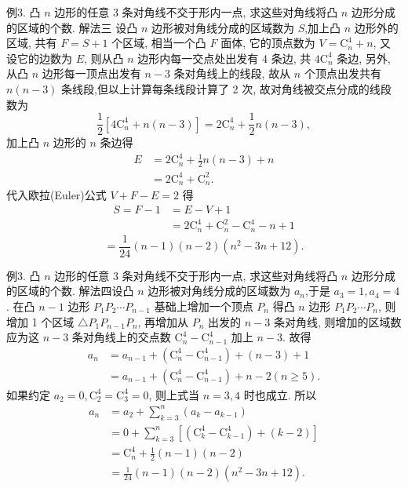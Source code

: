 例3. 凸 $n$ 边形的任意 3 条对角线不交于形内一点, 求这些对角线将凸 $n$ 边形分成的区域的个数.
解法三 设凸 $n$ 边形被对角线分成的区域数为 $S$,加上凸 $n$ 边形外的区域, 共有 $F=S+1$ 个区域, 相当一个凸 $F$ 面体, 它的顶点数为 $V=\mathrm{C}_n^4+n$, 又设它的边数为 $E$, 则从凸 $n$ 边形内每一交点处出发有 4 条边, 共 $4 \mathrm{C}_n^4$ 条边, 另外, 从凸 $n$ 边形每一顶点出发有 $n-3$ 条对角线上的线段, 故从 $n$ 个顶点出发共有 $n(n-3)$ 条线段,但以上计算每条线段计算了 2 次, 故对角线被交点分成的线段数为
$$
\frac{1}{2}\left[4 \mathrm{C}_n^4+n(n-3)\right]=2 \mathrm{C}_n^4+\frac{1}{2} n(n-3),
$$
加上凸 $n$ 边形的 $n$ 条边得
$$
\begin{aligned}
E & =2 \mathrm{C}_n^4+\frac{1}{2} n(n-3)+n \\
& =2 \mathrm{C}_n^4+\mathrm{C}_n^2 .
\end{aligned}
$$
代入欧拉(Euler)公式 $V+F-E=2$ 得
$$
\begin{aligned}
S=F-1 & =E-V+1 \\
& =2 \mathrm{C}_n^4+\mathrm{C}_n^2-\mathrm{C}_n^4-n+1
\end{aligned}
$$
$$
=\frac{1}{24}(n-1)(n-2)\left(n^2-3 n+12\right) .
$$



例3. 凸 $n$ 边形的任意 3 条对角线不交于形内一点, 求这些对角线将凸 $n$ 边形分成的区域的个数.
解法四设凸 $n$ 边形被对角线分成的区域数为 $a_n$,于是 $a_3=1, a_4=4$. 在凸 $n-1$ 边形 $P_1 P_2 \cdots P_{n-1}$ 基础上增加一个顶点 $P_n$ 得凸 $n$ 边形 $P_1 P_2 \cdots P_n$, 则增加 1 个区域 $\triangle P_1 P_{n-1} P_n$, 再增加从 $P_n$ 出发的 $n-3$ 条对角线, 则增加的区域数应为这 $n-3$ 条对角线上的交点数 $\mathrm{C}_n^4-\mathrm{C}_{n-1}^4$ 加上 $n-3$. 故得
$$
\begin{aligned}
a_n & =a_{n-1}+\left(\mathrm{C}_n^4-\mathrm{C}_{n-1}^4\right)+(n-3)+1 \\
& =a_{n-1}+\left(\mathrm{C}_n^4-\mathrm{C}_{n-1}^4\right)+n-2(n \geqslant 5) .
\end{aligned}
$$
如果约定 $a_2=0, \mathrm{C}_2^4=\mathrm{C}_3^4=0$, 则上式当 $n=3,4$ 时也成立.
所以
$$
\begin{aligned}
a_n & =a_2+\sum_{k=3}^n\left(a_k-a_{k-1}\right) \\
& =0+\sum_{k=3}^n\left[\left(\mathrm{C}_k^4-\mathrm{C}_{k-1}^4\right)+(k-2)\right] \\
& =\mathrm{C}_n^4+\frac{1}{2}(n-1)(n-2) \\
& =\frac{1}{24}(n-1)(n-2)\left(n^2-3 n+12\right) .
\end{aligned}
$$



